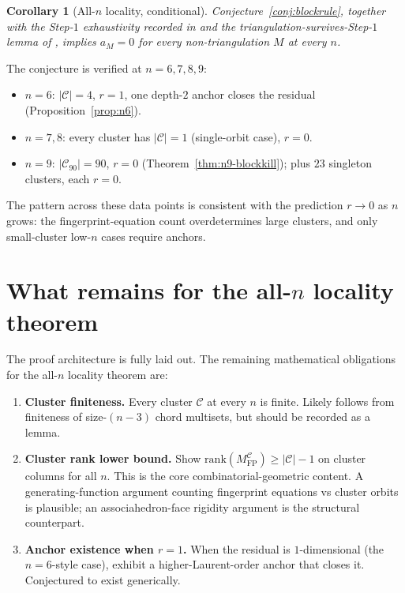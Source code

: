 \documentclass[11pt]{article}
\newtheorem{cor}[thm]{Corollary}
\theoremstyle{definition}
\begin{document}
\begin{cor}[All-$n$ locality, conditional]\label{cor:allnloc}
Conjecture~\ref{conj:blockrule}, together with the Step-$1$
exhaustivity recorded in \cite{step1stats} and the
triangulation-survives-Step-$1$ lemma of \cite{tri-survives},
implies $a_M=0$ for every non-triangulation $M$ at every $n$.
\end{cor}

The conjecture is verified at $n=6,7,8,9$:
\begin{itemize}[leftmargin=*,topsep=2pt,itemsep=2pt]
\item $n=6$: $|\mathcal C|=4$, $r=1$, one depth-$2$ anchor closes
the residual (Proposition~\ref{prop:n6}).
\item $n=7,8$: every cluster has $|\mathcal C|=1$ (single-orbit
case), $r=0$.
\item $n=9$: $|\mathcal C_{90}|=90$, $r=0$
(Theorem~\ref{thm:n9-blockkill}); plus $23$ singleton clusters,
each $r=0$.
\end{itemize}

The pattern across these data points is consistent with the
prediction $r\to 0$ as $n$ grows: the fingerprint-equation count
overdetermines large clusters, and only small-cluster low-$n$
cases require anchors.

\section{What remains for the all-$n$ locality theorem}\label{sec:remaining}

The proof architecture is fully laid out. The remaining mathematical
obligations for the all-$n$ locality theorem are:

\begin{enumerate}[leftmargin=*,topsep=2pt,itemsep=2pt]
\item \textbf{Cluster finiteness.} Every cluster $\mathcal C$ at
every $n$ is finite. Likely follows from finiteness of
size-$(n{-}3)$ chord multisets, but should be recorded as a lemma.

\item \textbf{Cluster rank lower bound.} Show
$\mathrm{rank}(M_{\mathrm{FP}}^{\mathcal C})\ge|\mathcal C|-1$ on
cluster columns for all $n$. This is the core combinatorial-geometric
content. A generating-function argument counting fingerprint
equations vs cluster orbits is plausible; an associahedron-face
rigidity argument is the structural counterpart.

\item \textbf{Anchor existence when $r=1$.} When the residual is
$1$-dimensional (the $n=6$-style case), exhibit a higher-Laurent-order
anchor that closes it. Conjectured to exist generically.
\end{enumerate}
\end{document}
